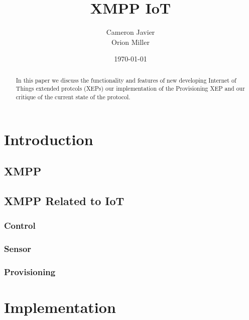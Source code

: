 \documentclass{sig-alternate}
\begin{document}
\title{XMPP IoT}
\author{Cameron Javier\\
        Orion Miller}
\date{\today}
\maketitle

\begin{abstract}
In this paper we discuss the functionality and features of new developing
Internet of Things extended protcols (XEPs) our implementation of the
Provisioning XEP and our critique of the current state of the protocol.
\end{abstract}


\section{Introduction}



\subsection{XMPP}



\subsection{XMPP Related to IoT}



\subsubsection{Control}



\subsubsection{Sensor}



\subsubsection{Provisioning}



\section{Implementation}
\end{document}
